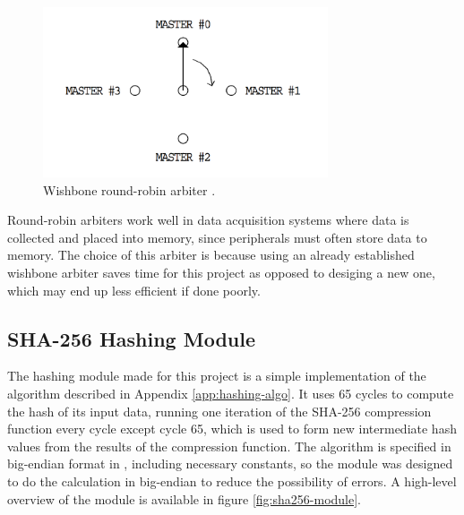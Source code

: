 %
%
\begin{figure}[htb]
    \centering
    \includegraphics[width=0.75\textwidth]{Figures/Tile/WBArbiter}
    \caption{Wishbone round-robin arbiter \cite{WBLibrary}.}
    \label{fig:WBArbiter}
\end{figure}

Round-robin arbiters work well in data acquisition systems where data is collected and placed into memory, since peripherals must often store data to memory.
The choice of this arbiter is because using an already established wishbone arbiter saves time for this project as opposed to desiging a new one, which may end up less efficient if done poorly.

\subsection{SHA-256 Hashing Module}

The hashing module made for this project is a simple implementation of the algorithm described in
Appendix \ref{app:hashing-algo}. It uses 65 cycles to compute the hash of its input data, running
one iteration of the SHA-256 compression function every cycle except cycle 65, which is used to
form new intermediate hash values from the results of the compression function. The algorithm is
specified in big-endian format in \cite{fips180-4}, including necessary constants, so the module
was designed to do the calculation in big-endian to reduce the possibility of errors. A high-level
overview of the module is available in figure \ref{fig:sha256-module}.

